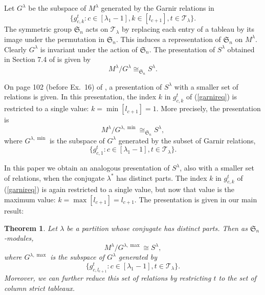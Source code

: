 \documentclass[12pt]{amsart}
\numberwithin{equation}{section}
\newcommand{\be}{\begin{equation}}
\newcommand{\ee}{\end{equation}}
\def\sg{\mathfrak S}
\newtheorem{theorem}{Theorem}[section]
\begin{document}
\vspace{.1in} Let $G^{\lambda}$ be the subspace of $M^\lambda$ generated by the Garnir relations in
 \begin{equation} \label{garnireq} \{ g^t_{c,k} : c \in [\lambda_1-1], k \in [l_{c+1}], t \in \mathcal T_\lambda \}  .\end{equation}  
The symmetric group $\sg_n$ acts on $\mathcal T_\lambda$ by replacing
 each entry of a tableau by its image under the permutation in $\sg_n$.
 This induces a representation of $\sg_n$ on $M^\lambda$. Clearly $G^\lambda$ is invariant under the action of
$\sg_n$. 
The  presentation of $S^\lambda$ obtained in Section 7.4 of \cite{Fu} is given by
   \be \label{Fultoneq} M^\lambda/G^\lambda \cong_{\sg_n} S^\lambda. \ee



   
 On page 102 (before Ex.~16) of \cite{Fu}, a presentation of $S^\lambda$ with a smaller set of relations is given.  In this presentation, the index $k$ in $g^t_{c,k}$ of (\ref{garnireq}) is restricted to a single value:  $k=\min [l_{c+1}]= 1$. More precisely, the presentation is
\be \label{1fulton} M^{\lambda} / G^{\lambda,\min} \cong_{\sg_n} S^{\lambda} ,\ee where
 $G^{\lambda,\min}$ is the subspace of $G^\lambda$ generated by the subset of Garnir relations, $$\{ g^t_{c,1} : c \in [\lambda_1-1], t \in \mathcal T_\lambda \}  .$$ 
 
 In this paper we obtain an analogous presentation of $S^\lambda$, also with a smaller set of relations, when the conjugate $\lambda^*$ has distinct parts. The index $k$ in $g^t_{c,k}$ of (\ref{garnireq}) is again restricted to a single value, but now that value is the maximum value:  $k=\max [l_{c+1}]= l_{c+1}$.
The presentation 
is given in our main result:
\begin{theorem} \label{mainth} Let $\lambda$ be a partition whose conjugate has distinct parts. Then as $\sg_n$-modules,
\begin{equation} \label{maineq} M^{\lambda} / G^{\lambda,\max} \cong S^{\lambda} ,\end{equation} where
 $G^{\lambda,\max}$ is the subspace of $G^\lambda$ generated by $$\{ g^t_{c,l_{c+1}} : c \in [\lambda_1-1], t \in \mathcal T_\lambda \}  .$$
Moreover, we can further reduce this set of relations by restricting $t$ to the set of column strict tableaux.
\end{theorem} 
\end{document}
